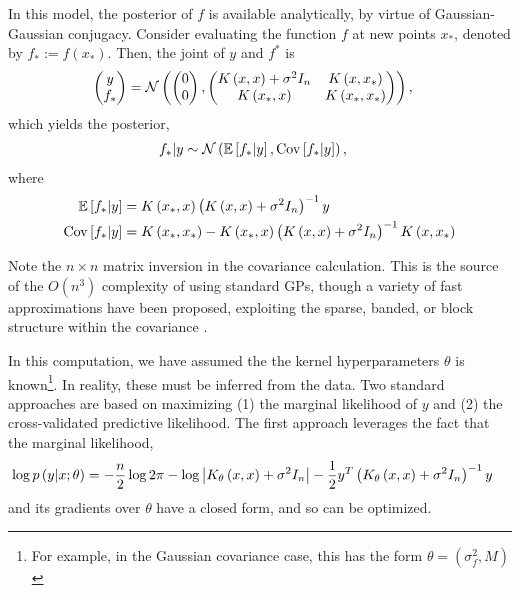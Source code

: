 \documentclass{article}
\begin{document}
In this model, the posterior of $f$ is available analytically, by virtue of
Gaussian-Gaussian conjugacy. Consider evaluating the function $f$ at new points
$x_{\ast}$, denoted by $f_{\ast} := f\left(x_{\ast}\right)$. Then, the joint of
$y$ and $f^{\ast}$ is
\begin{align*}
  \begin{pmatrix}
    y \\ f_{\ast}
  \end{pmatrix} &= \mathcal{N}\left(
 \begin{pmatrix}
   0 \\ 0
 \end{pmatrix} ,
\begin{pmatrix}
  K\left(x, x\right) + \sigma^{2}I_{n} & K\left(x, x_{\ast}\right) \\
  K\left(x_{\ast}, x\right) & K\left(x_{\ast}, x_{\ast}\right)
\end{pmatrix}
  \right),
\end{align*}
which yields the posterior,
\begin{align*}
  f_{\ast} \vert y &\sim \mathcal{N}\left(\mathbb{E}\left[{f_{\ast} \vert y}\right], \mathrm{Cov}\left[{f_{\ast} \vert y}\right]\right),
\end{align*}
where
\begin{align*}
  \mathbb{E}\left[{f_{\ast} \vert y}\right] &= K\left(x_{\ast}, x\right)\left(K\left(x, x\right) + \sigma^{2}I_{n}\right)^{-1}y \\
  \mathrm{Cov}\left[{f_{\ast} \vert y}\right] &= K\left(x_{\ast}, x_{\ast}\right) - K\left(x_{\ast}, x\right)\left(K\left(x, x\right) + \sigma^{2}I_{n}\right)^{-1}K\left(x, x_{\ast}\right)
\end{align*}

Note the $n\times n$ matrix inversion in the covariance calculation. This is the
source of the $O\left(n^{3}\right)$ complexity of using standard GPs, though a
variety of fast approximations have been proposed, exploiting the sparse,
banded, or block structure within the covariance
\citep{quinonero2007approximation}.

In this computation, we have assumed the the kernel hyperparameters $\theta$ is
known\footnote{For example, in the Gaussian covariance case, this has the form
  $\theta = \left(\sigma_{f}^{2}, M\right)$}. In reality, these must be inferred
from the data. Two standard approaches are based on maximizing (1) the marginal
likelihood of $y$ and (2) the cross-validated predictive likelihood. The first
approach leverages the fact that the marginal likelihood,
\begin{align*}
\log p\left(y \vert x; \theta\right) &= -\frac{n}{2}\log 2\pi - \log\left|K_{\theta}\left(x, x\right) + \sigma^{2}I_{n}\right| - \frac{1}{2}y^{T}\left(K_{\theta}\left(x, x\right) + \sigma^{2}I_{n}\right)^{-1}y
\end{align*}
and its gradients over $\theta$ have a closed form, and so can be optimized.
\end{document}
